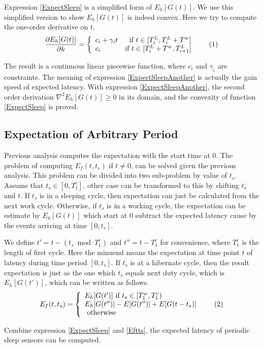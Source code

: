 \documentclass[conference]{IEEEtran}
\newcommand\numberthis{\addtocounter{equation}{1}\tag{\theequation}}
\begin{document}
Expression \eqref{ExpectSleep} is a simplified form of $E_h[G(t)]$.
We use this simplified version to show $E_h[G(t)]$ is indeed convex.
Here we try to compute the one-order derivative on $t$.
\[\frac{\partial E_h[G(t)]}{\partial k} = \left\{
\begin{array}{lr}
c_i+\gamma_i t & \text{if }t \in [T^{L}_{i}, T^{L}_{i}+T^{w}]\\
c_i & \text{if }t \in [T^{L}_{i}+T^{w}, T^{L}_{i+1}]
\end{array}	\numberthis \label{ExpectSleepAnother}
\right.
\]

The result is a continuous linear piecewise function, where $c_i$ and $\gamma_i$ are constraints.
The meaning of expression \eqref{ExpectSleepAnother} is actually the gain speed of expected latency. 
With expression \eqref{ExpectSleepAnother}, the second order derivation $\nabla^{2} E_h[G(t)]\geq0$ in its domain, and the convexity of function \eqref{ExpectSleep} is proved. 

\subsection{Expectation of Arbitrary Period}
Previous analysis computes the expectation with the start time at $0$. 
The problem of computing $E_f(t,t_s)$ if $t\ne0$, can be solved given the previous analysis. 
This problem can be divided into two sub-problem by value of $t_s$.
Assume that $t_s\in [0,T^{c}_{1}]$, other case can be transformed to this by shifting $t_s$ and $t$.
If $t_s$ is in a sleeping cycle, then expectation can just be calculated from the next work cycle.
Otherwise, if $t_s$ is in a working cycle, the expectation can be estimate by $E_h[G(t)]$ which start at $0$ subtract the expected latency cause by the events arriving at time $[0, t_s]$.

We define $t'=t-(t_s\bmod T^{c}_{1})$ and $t''=t-T^{c}_{1}$ for convenience, where $T^{c}_{1}$ is the length of first cycle.
Here the minuend means the expectation at time point $t$ of latency during time period $[0, t_s]$.
If $t_s$ is at a hibernate cycle, then the result expectation is just as the one which $t_s$ equals next duty cycle, which is $E_h[G(t')]$, which can be written as follows.
\[E_f(t,t_s)=\left\{
\begin{array}{lr}
E_h[G(t')]\text{ if } t_s\in [T^{w}_{1}, T^{c}_{1})\\
E_h[G(t'')]-E[G(t'')]+E[G(t-t_s)]\\
\text{ otherwise }
\end{array}\numberthis \label{Eftts}
\right.
\]

Combine expression \eqref{ExpectSleep} and \eqref{Eftts}, the expected latency of periodic sleep sensors can be computed.
\end{document}

